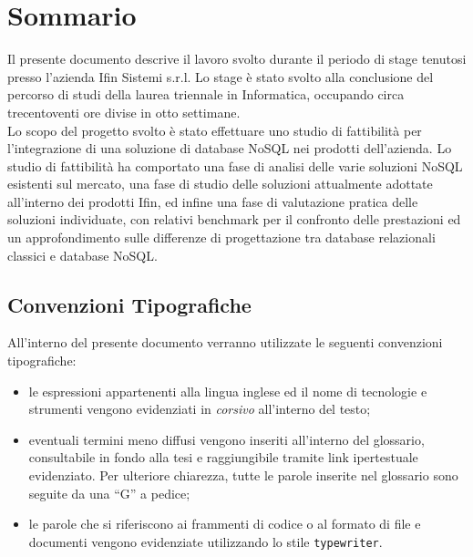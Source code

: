 
\cleardoublepage
{}
{}
\begingroup
\let\clearpage\relax
\let\cleardoublepage\relax
\let\cleardoublepage\relax

\chapter*{Sommario}

Il presente documento descrive il lavoro svolto durante il periodo di stage tenutosi presso l'azienda Ifin Sistemi s.r.l. Lo stage è stato svolto alla conclusione del percorso di studi della laurea triennale in Informatica, occupando circa trecentoventi ore divise in otto settimane.\\
Lo scopo del progetto svolto è stato effettuare uno studio di fattibilità per l’integrazione di una soluzione di database NoSQL nei prodotti dell'azienda. Lo studio di fattibilità ha comportato una fase di analisi delle varie soluzioni NoSQL esistenti sul mercato, una fase di studio delle soluzioni attualmente adottate all'interno dei prodotti Ifin, ed infine una fase di valutazione pratica delle soluzioni individuate, con relativi benchmark per il confronto delle prestazioni ed un approfondimento sulle differenze di progettazione tra database relazionali classici e database NoSQL.

\vfill

\section*{Convenzioni Tipografiche}

All'interno del presente documento verranno utilizzate le seguenti convenzioni tipografiche:
\begin{itemize}
    \item le espressioni appartenenti alla lingua inglese ed il nome di tecnologie e strumenti vengono evidenziati in \textit{corsivo} all'interno del testo;
    \item eventuali termini meno diffusi vengono inseriti all'interno del glossario, consultabile in fondo alla tesi e raggiungibile tramite link ipertestuale \textcolor{bluelink}{evidenziato}. Per ulteriore chiarezza, tutte le parole inserite nel glossario sono seguite da una ``G'' a pedice;
    \item le parole che si riferiscono ai frammenti di codice o al formato di file e documenti vengono evidenziate utilizzando lo stile \texttt{typewriter}.
\end{itemize}


%
%

\endgroup			

\vfill

